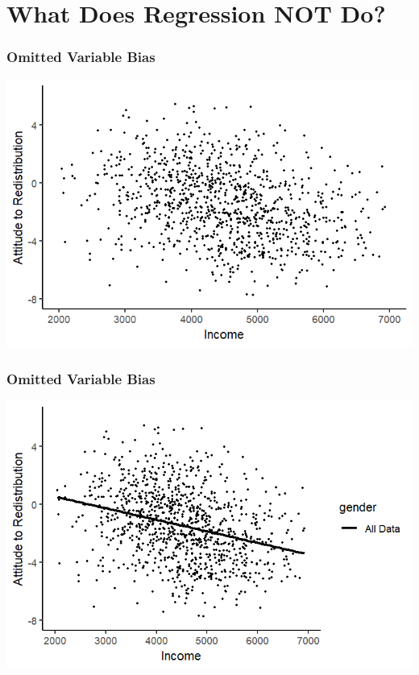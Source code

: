 \documentclass[xcolor=x11names,compress]{beamer}\usepackage[]{graphicx}\usepackage[]{color}
\makeatletter
\def\maxwidth{ %
  \ifdim\Gin@nat@width>\linewidth
    \linewidth
  \else
    \Gin@nat@width
  \fi
}
\newenvironment{knitrout}{}{} %
\renewcommand{\(}{\begin{columns}}
\renewcommand{\)}{\end{columns}}
\newcommand{\<}[1]{\begin{column}{#1}}
\renewcommand{\>}{\end{column}}
\makeatother
\begin{document}
\begin{frame}
\begin{multicols}{2}
\begin{knitrout}
\end{knitrout}
\end{multicols}
\end{frame}

\section{What Does Regression NOT Do?}

\begin{frame}
\frametitle{Omitted Variable Bias}
\begin{knitrout}
\color{fgcolor}
\includegraphics[width=\maxwidth]{figure/confound3b-1} 

\end{knitrout}
\end{frame}

\begin{frame}
\frametitle{Omitted Variable Bias}
\begin{knitrout}
\color{fgcolor}
\includegraphics[width=\maxwidth]{figure/confound3c-1} 

\end{knitrout}
\end{frame}
\end{document}
